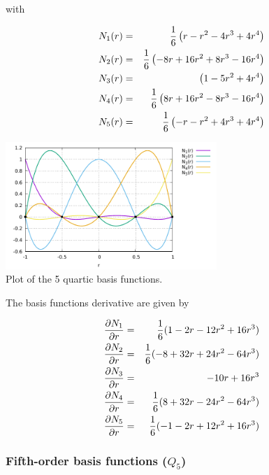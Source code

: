 with 
\begin{mdframed}[backgroundcolor=blue!5]
\begin{eqnarray}
N_1(r)&=& \frac{1}{6} \left(  r- r^2 -4r^3 +4r^4\right) \nonumber\\
N_2(r)&=& \frac{1}{6} \left(  -8r+16 r^2 +8r^3 -16 r^4\right)  \nonumber\\
N_3(r)&=& \left( 1 -5r^2+4r^4  \right) \nonumber \\
N_4(r)&=& \frac{1}{6} \left(  8r+16 r^2 -8r^3 -16 r^4\right)  \nonumber\\
N_5(r)&=& \frac{1}{6} \left(  -r- r^2 +4r^3 +4r^4\right) 
\end{eqnarray}
\end{mdframed}

\begin{center}
\includegraphics[width=8cm]{images/basis1D/quartic.pdf}\\
{\captionfont Plot of the 5 quartic basis functions.}
\end{center}

The basis functions derivative are given by
\begin{mdframed}[backgroundcolor=blue!5]
\begin{eqnarray}
\frac{\partial N_1}{\partial r}&=& \frac{1}{6}(1-2r-12r^2+16r^3) \nonumber\\
\frac{\partial N_2}{\partial r}&=& \frac{1}{6}(-8+32r+24r^2-64r^3) \nonumber\\
\frac{\partial N_3}{\partial r}&=& -10r+16r^3 \nonumber\\
\frac{\partial N_4}{\partial r}&=& \frac{1}{6} (8+32r-24r^2-64r^3) \nonumber\\
\frac{\partial N_5}{\partial r}&=& \frac{1}{6} (-1-2r+12r^2+16r^3) 
\end{eqnarray}
\end{mdframed}


\subsubsection{Fifth-order basis functions ($Q_5$) \label{sec:bf5}}

